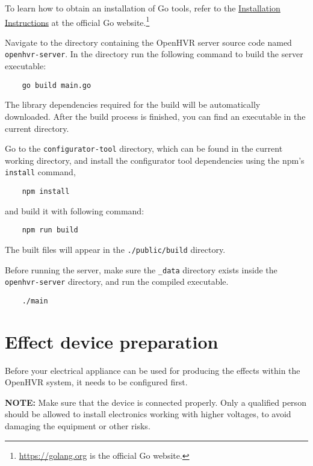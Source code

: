 To learn how to obtain an installation of Go tools, refer to the
\href{https://golang.org/doc/install}{Installation Instructions} at the
official Go website.\footnote{\href{https://golang.org}{https://golang.org} is the official Go website.}

Navigate to the directory containing the OpenHVR server source code named
\verb|openhvr-server|. In the directory run the following command to build the
server executable:

\begin{verbatim}
    go build main.go
\end{verbatim}

The library dependencies required for the build will be automatically downloaded.
After the build process is finished, you can find an executable in the current
directory.

Go to the \verb|configurator-tool| directory, which can be found in the current
working directory, and install the configurator tool dependencies using the npm's
\verb|install| command,

\begin{verbatim}
    npm install
\end{verbatim}

and build it with following command:

\begin{verbatim}
    npm run build
\end{verbatim}

The built files will appear in the \verb|./public/build| directory.

Before running the server, make sure the \verb|_data| directory exists inside
the \verb|openhvr-server| directory, and run the compiled executable.

\begin{verbatim}
    ./main
\end{verbatim}

\pagebreak

\section*{Effect device preparation}

Before your electrical appliance can be used for producing the effects
within the OpenHVR system, it needs to be configured first.

\textbf{NOTE:} Make sure that the device is connected properly. Only a qualified
person should be allowed to install electronics working with higher voltages, to avoid
damaging the equipment or other risks.

